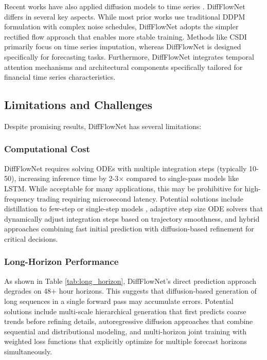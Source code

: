 \documentclass[11pt,a4paper]{article}
\begin{document}
Recent works have also applied diffusion models to time series \cite{rasul2021autoregressive,tashiro2021csdi,yuan2024diffusionts}. DiffFlowNet differs in several key aspects. While most prior works use traditional DDPM formulation with complex noise schedules, DiffFlowNet adopts the simpler rectified flow approach that enables more stable training. Methods like CSDI \cite{tashiro2021csdi} primarily focus on time series imputation, whereas DiffFlowNet is designed specifically for forecasting tasks. Furthermore, DiffFlowNet integrates temporal attention mechanisms and architectural components specifically tailored for financial time series characteristics.

\subsection{Limitations and Challenges}

Despite promising results, DiffFlowNet has several limitations:

\subsubsection{Computational Cost}

DiffFlowNet requires solving ODEs with multiple integration steps (typically 10-50), increasing inference time by 2-3× compared to single-pass models like LSTM. While acceptable for many applications, this may be prohibitive for high-frequency trading requiring microsecond latency. Potential solutions include distillation to few-step or single-step models \cite{salimans2022progressive}, adaptive step size ODE solvers that dynamically adjust integration steps based on trajectory smoothness, and hybrid approaches combining fast initial prediction with diffusion-based refinement for critical decisions.

\subsubsection{Long-Horizon Performance}

As shown in Table \ref{tab:long_horizon}, DiffFlowNet's direct prediction approach degrades on 48+ hour horizons. This suggests that diffusion-based generation of long sequences in a single forward pass may accumulate errors. Potential solutions include multi-scale hierarchical generation that first predicts coarse trends before refining details, autoregressive diffusion approaches that combine sequential and distributional modeling, and multi-horizon joint training with weighted loss functions that explicitly optimize for multiple forecast horizons simultaneously.
\end{document}
